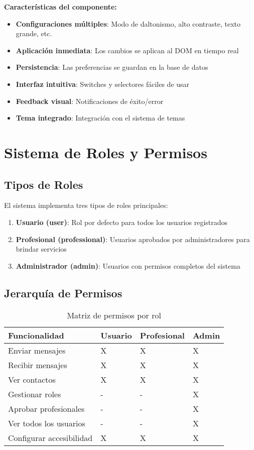 \documentclass[12pt,a4paper]{article}
\begin{document}
\textbf{Características del componente:}
\begin{itemize}
    \item \textbf{Configuraciones múltiples}: Modo de daltonismo, alto contraste, texto grande, etc.
    \item \textbf{Aplicación inmediata}: Los cambios se aplican al DOM en tiempo real
    \item \textbf{Persistencia}: Las preferencias se guardan en la base de datos
    \item \textbf{Interfaz intuitiva}: Switches y selectores fáciles de usar
    \item \textbf{Feedback visual}: Notificaciones de éxito/error
    \item \textbf{Tema integrado}: Integración con el sistema de temas
\end{itemize}

\section{Sistema de Roles y Permisos}

\subsection{Tipos de Roles}

El sistema implementa tres tipos de roles principales:

\begin{enumerate}
    \item \textbf{Usuario (user)}: Rol por defecto para todos los usuarios registrados
    \item \textbf{Profesional (professional)}: Usuarios aprobados por administradores para brindar servicios
    \item \textbf{Administrador (admin)}: Usuarios con permisos completos del sistema
\end{enumerate}

\subsection{Jerarquía de Permisos}

\begin{table}[h]
\centering
\begin{tabular}{@{}llll@{}}
\toprule
\textbf{Funcionalidad} & \textbf{Usuario} & \textbf{Profesional} & \textbf{Admin} \\
\midrule
Enviar mensajes & X & X & X \\
Recibir mensajes & X & X & X \\
Ver contactos & X & X & X \\
Gestionar roles & - & - & X \\
Aprobar profesionales & - & - & X \\
Ver todos los usuarios & - & - & X \\
Configurar accesibilidad & X & X & X \\
\bottomrule
\end{tabular}
\caption{Matriz de permisos por rol}
\end{table}
\end{document}
